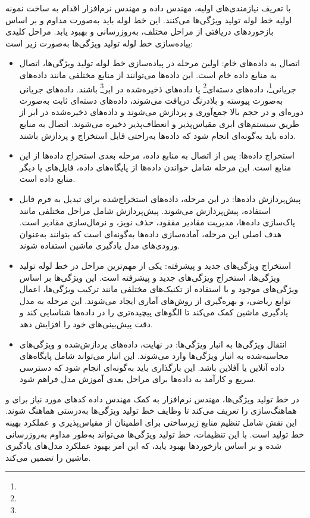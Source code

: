 با تعریف نیازمندی‌های اولیه، مهندس داده و مهندس نرم‌افزار اقدام به ساخت نمونه اولیه خط لوله تولید ویژگی‌ها می‌کنند. این خط لوله باید به‌صورت مداوم و بر اساس بازخوردهای دریافتی از مراحل مختلف، به‌روزرسانی و بهبود یابد. مراحل کلیدی پیاده‌سازی خط لوله تولید ویژگی‌ها به‌صورت زیر است:
\begin{itemize}
	\item 
	اتصال به داده‌های خام:
	اولین مرحله در پیاده‌سازی خط لوله تولید ویژگی‌ها، اتصال به منابع داده خام است. این داده‌ها می‌توانند از منابع مختلفی مانند داده‌های جریانی\footnote{}، داده‌های دسته‌ای\footnote{} یا داده‌های ذخیره‌شده در ابر\footnote{} باشند. داده‌های جریانی به‌صورت پیوسته و بلادرنگ دریافت می‌شوند، داده‌های دسته‌ای ثابت به‌صورت دوره‌ای و در حجم بالا جمع‌آوری و پردازش می‌شوند و داده‌های ذخیره‌شده در ابر از طریق سیستم‌های ابری مقیاس‌پذیر و انعطاف‌پذیر ذخیره می‌شوند. اتصال به منابع داده باید به‌گونه‌ای انجام شود که داده‌ها به‌راحتی قابل استخراج و پردازش باشند.
	\item 
	استخراج داده‌ها:
	پس از اتصال به منابع داده، مرحله بعدی استخراج داده‌ها از این منابع است. این مرحله شامل خواندن داده‌ها از پایگاه‌های داده، فایل‌های  یا دیگر منابع داده است.
	\item 
	پیش‌پردازش داده‌ها:
	در این مرحله، داده‌های استخراج‌شده برای تبدیل به فرم قابل استفاده، پیش‌پردازش می‌شوند. پیش‌پردازش شامل مراحل مختلفی مانند پاک‌سازی داده‌ها، مدیریت مقادیر مفقود، حذف نویز، و نرمال‌سازی مقادیر است. هدف اصلی این مرحله، آماده‌سازی داده‌ها به‌گونه‌ای است که بتوانند به‌عنوان ورودی‌های مدل یادگیری ماشین استفاده شوند.
	\item 
	استخراج ویژگی‌های جدید و پیشرفته:
	یکی از مهم‌ترین مراحل در خط لوله تولید ویژگی‌ها، استخراج ویژگی‌های جدید و پیشرفته است. این ویژگی‌ها بر اساس ویژگی‌های موجود و با استفاده از تکنیک‌های مختلفی مانند ترکیب ویژگی‌ها، اعمال توابع ریاضی، و بهره‌گیری از روش‌های آماری ایجاد می‌شوند. این مرحله به مدل یادگیری ماشین کمک می‌کند تا الگوهای پیچیده‌تری را در داده‌ها شناسایی کند و دقت پیش‌بینی‌های خود را افزایش دهد.
	\item 
	انتقال ویژگی‌ها به انبار ویژگی‌ها:
	در نهایت، داده‌های پردازش‌شده و ویژگی‌های محاسبه‌شده به انبار ویژگی‌ها وارد می‌شوند. این انبار می‌تواند شامل پایگاه‌های داده آنلاین یا آفلاین باشد. این بارگذاری باید به‌گونه‌ای انجام شود که دسترسی سریع و کارآمد به داده‌ها برای مراحل بعدی آموزش مدل فراهم شود.
\end{itemize}

در خط تولید ویژگی‌ها، مهندس نرم‌افزار به کمک مهندس داده کدهای مورد نیاز برای  و هماهنگ‌سازی را تعریف می‌کند تا وظایف خط تولید ویژگی‌ها به‌درستی هماهنگ شوند. این نقش شامل تنظیم منابع زیرساختی برای اطمینان از مقیاس‌پذیری و عملکرد بهینه خط تولید است. با این تنظیمات، خط تولید ویژگی‌ها می‌تواند به‌طور مداوم به‌روزرسانی شده و بر اساس بازخوردها بهبود یابد، که این امر بهبود عملکرد مدل‌های یادگیری ماشین را تضمین می‌کند.

